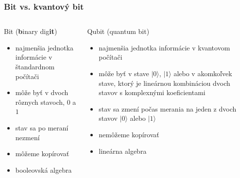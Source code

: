 \documentclass{beamer}
\newcommand{\ket}[1]{\lvert#1\rangle} %
\begin{document}
\begin{frame}
	\frametitle{Bit vs. kvantový bit}
	\begin{columns}[t]
		\begin{column}{.5\textwidth}
			\centering
			Bit (\textbf{b}inary dig\textbf{it})  
			\vspace{0.4cm} 
			\begin{itemize}
				\item najmenšia jednotka informácie v štandardnom počítači
				\item môže byť v dvoch rôznych stavoch, $0$ a $1$
				\item stav sa po meraní nezmení
				\item môžeme kopírovať
				\item booleovská algebra
				      				      
			\end{itemize}
		\end{column}
						      
		\begin{column}{.5\textwidth}
			\centering
			Qubit (quantum bit)
			\vspace{0.4cm}
			\begin{itemize}
				\item najmenšia jednotka informácie v kvantovom počítači
				\item môže byť v stave $\ket{0}$, $\ket{1}$ alebo v akomkoľvek stave, ktorý je lineárnou kombináciou dvoch stavov s komplexnými koeficientami
				\item stav sa zmení počas merania na jeden z dvoch stavov $\ket{0}$ alebo $\ket{1}$
				\item nemôžeme kopírovať
				\item lineárna algebra 
				      
			\end{itemize}		
		\end{column}
	\end{columns}
\end{frame}
\end{document}
